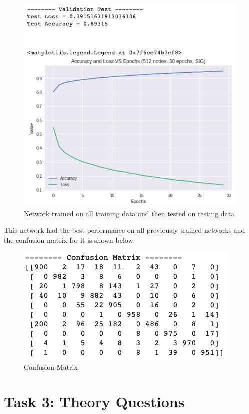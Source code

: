 \documentclass[a4paper, 12pt]{article}
\begin{document}
    \begin{figure}[h!]
        \centering
        \captionsetup{justification=centering}
        \includegraphics[scale = 0.4]{Final.png}
        \caption{Network trained on all training data and then tested on testing data}
    \end{figure}

    This network had the best performance on all previously trained networks and the confusion matrix for it is shown below:

    \begin{figure}[h!]
        \centering
        \captionsetup{justification=centering}
        \includegraphics[scale = 0.4]{cm.png}
        \caption{Confusion Matrix}
    \end{figure}

    \section{Task 3: Theory Questions}
\end{document}
